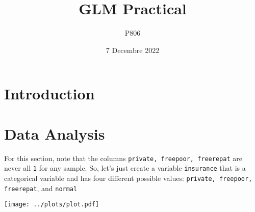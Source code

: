 \documentclass[a4paper,11pt]{article}
\title{GLM Practical}
\author{P806}
\date{7 Decembre 2022}
\begin{document}
\maketitle

\section{Introduction}

\section{Data Analysis}
For this section, note that the columns \texttt{private, freepoor, freerepat} are never all \texttt{1} for any sample. So, let's just create a variable \texttt{insurance} that is a categorical variable and has four different possible values: \texttt{private, freepoor, freerepat}, and \texttt{normal} 


\texttt{[image: ../plots/plot.pdf]}
\end{document}
